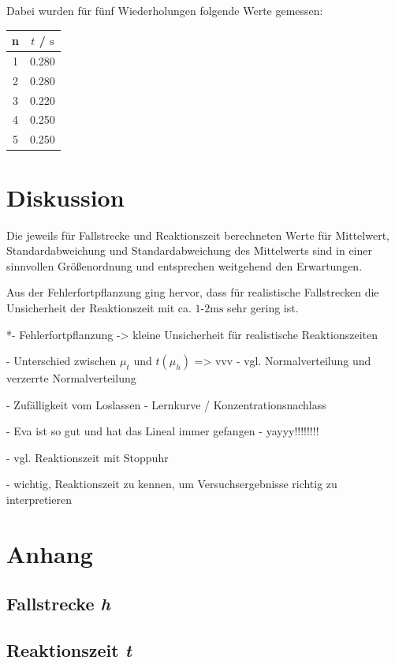 \documentclass[a4paper,12pt]{article}
\begin{document}
Dabei wurden für fünf Wiederholungen folgende Werte gemessen:

\begin{table}[H]
    \centering
    \begin{tabular}{|c|c|}
        \hline
        n & $t$ / $\mathrm{s}$ \\
        \hline
        1 & 0.280 \\
        2 & 0.280 \\
        3 & 0.220 \\
        4 & 0.250 \\
        5 & 0.250 \\
        \hline
    \end{tabular}
\end{table}


\section{Diskussion}

Die jeweils für Fallstrecke und Reaktionszeit berechneten Werte für Mittelwert, Standardabweichung und
Standardabweichung des Mittelwerts sind in einer sinnvollen Größenordnung und entsprechen weitgehend den Erwartungen.

Aus der Fehlerfortpflanzung ging hervor, dass für realistische Fallstrecken die Unsicherheit der Reaktionszeit
mit ca. $1$-$2\mathrm{ms}$ sehr gering ist.





*- Fehlerfortpflanzung -> kleine Unsicherheit für realistische Reaktionszeiten

- Unterschied zwischen $\mu_t$ und $t(\mu_h)$ => vvv
- vgl. Normalverteilung und verzerrte Normalverteilung

- Zufälligkeit vom Loslassen
- Lernkurve / Konzentrationsnachlass

- Eva ist so gut und hat das Lineal immer gefangen - yayyy!!!!!!!!

- vgl. Reaktionszeit mit Stoppuhr

- wichtig, Reaktionszeit zu kennen, um Versuchsergebnisse richtig zu interpretieren

\newpage
\section{Anhang}
\subsection{Fallstrecke \textit{h}}
\label{AnahangFallstrecke}




\newpage
\subsection{Reaktionszeit \textit{t}}
\label{AnahangReaktionszeit}


\end{document}
